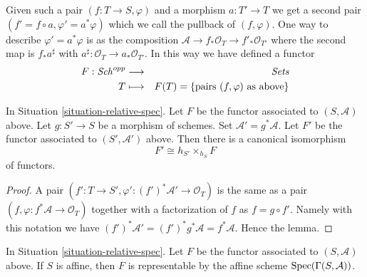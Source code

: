 \medskip\noindent
Given such a
pair $(f : T \to S, \varphi)$ and a morphism $a : T' \to T$ we get
a second pair $(f' = f \circ a, \varphi' = a^*\varphi)$ which we
call the pullback of $(f, \varphi)$. One way to describe
$\varphi' = a^*\varphi$ is as the composition
$\mathcal{A} \to f_*\mathcal{O}_T \to f'_*\mathcal{O}_{T'}$
where the second map is $f_*a^\sharp$ with
$a^\sharp : \mathcal{O}_T \to a_*\mathcal{O}_{T'}$.
In this way we have defined a functor
\begin{eqnarray}
\label{equation-spec}
F : \mathit{Sch}^{opp} & \longrightarrow & \textit{Sets} \\
T & \longmapsto & F(T) = \{\text{pairs }(f, \varphi) \text{ as above}\}
\nonumber
\end{eqnarray}

\begin{lemma}
\label{lemma-spec-base-change}
In Situation \ref{situation-relative-spec}.
Let $F$ be the functor
associated to $(S, \mathcal{A})$ above.
Let $g : S' \to S$ be a morphism of schemes.
Set $\mathcal{A}' = g^*\mathcal{A}$. Let $F'$ be the
functor associated to $(S', \mathcal{A}')$ above.
Then there is a canonical isomorphism
$$
F' \cong h_{S'} \times_{h_S} F
$$
of functors.
\end{lemma}

\begin{proof}
A pair $(f' : T \to S', \varphi' : (f')^*\mathcal{A}' \to \mathcal{O}_T)$
is the same as a pair $(f, \varphi : f^*\mathcal{A} \to \mathcal{O}_T)$
together with a factorization of $f$ as $f = g \circ f'$. Namely with
this notation we have
$(f')^* \mathcal{A}' = (f')^*g^*\mathcal{A} = f^*\mathcal{A}$.
Hence the lemma.
\end{proof}

\begin{lemma}
\label{lemma-spec-affine}
In Situation \ref{situation-relative-spec}.
Let $F$ be the functor associated to $(S, \mathcal{A})$ above.
If $S$ is affine, then $F$ is representable by the
affine scheme $\mathop{\mathrm{Spec}}(\Gamma(S, \mathcal{A}))$.
\end{lemma}

